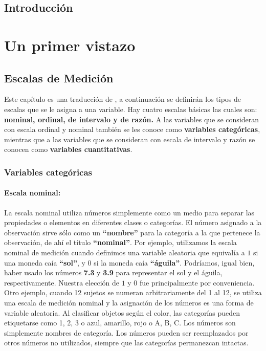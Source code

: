 \documentclass[
  a4paper,
  oneside,
  openany]{book}
\begin{document}
\hypertarget{introducciuxf3n}{%
\chapter*{Introducción}\label{introducciuxf3n}}


\hypertarget{part-un-primer-vistazo}{%
\part{Un primer vistazo}\label{part-un-primer-vistazo}}

\hypertarget{escalas-de-mediciuxf3n}{%
\chapter{Escalas de Medición}\label{escalas-de-mediciuxf3n}}

Este capítulo es una traducción de \citet{conover1998practical}, a continuación se definirán los tipos de escalas que se le asigna a una variable. Hay cuatro escalas básicas las cuales son: \textbf{nominal, ordinal, de intervalo y de razón.} A las variables que se consideran con escala ordinal y nominal también se les conoce como \textbf{variables categóricas}, mientras que a las variables que se consideran con escala de intervalo y razón se conocen como \textbf{variables cuantitativas}.

\hypertarget{variables-categuxf3ricas}{%
\section{Variables categóricas}\label{variables-categuxf3ricas}}

\hypertarget{escala-nominal}{%
\subsection{Escala nominal:}\label{escala-nominal}}

La escala nominal utiliza números simplemente como un medio para separar las propiedades o elementos en diferentes clases o categorías. El número asignado a la observación sirve sólo como un \textbf{``nombre''} para la categoría a la que pertenece la observación, de ahí el título \textbf{``nominal''}. Por ejemplo, utilizamos la escala nominal de medición cuando definimos una variable aleatoria que equivalía a \(1\) si una moneda caía \textbf{``sol''}, y \(0\) si la moneda caía \textbf{``águila''}. Podríamos, igual bien, haber usado los números \textbf{7.3} y \textbf{3.9} para representar el sol y el águila, respectivamente. Nuestra elección de \(1\) y \(0\) fue principalmente por conveniencia.
Otro ejemplo, cuando 12 sujetos se numeran arbitrariamente del 1 al 12, se utiliza una escala de medición nominal y la asignación de los números es una forma de variable aleatoria. Al clasificar objetos según el color, las categorías pueden etiquetarse como 1, 2, 3 o azul, amarillo, rojo o A, B, C. Los números son simplemente nombres de categoría. Los números pueden ser reemplazados por otros números no utilizados, siempre que las categorías permanezcan intactas.
\end{document}

